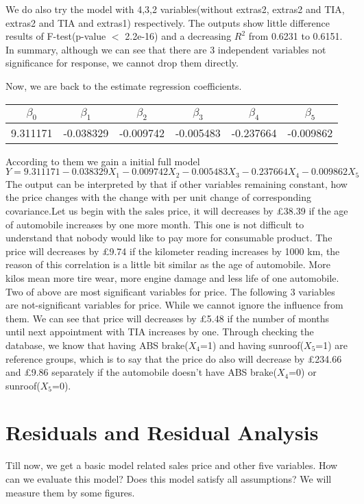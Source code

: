 \documentclass[a4paper]{article}
\begin{document}
\noindent
 We do also try the model with 4,3,2 variables(without extras2, extras2 and TIA, extras2 and TIA and extras1) respectively. The outputs show little difference results of F-test(p-value $<$ 2.2e-16) and a decreasing $R^2$ from 0.6231 to 0.6151. In summary, although we can see that there are 3 independent variables not significance for response, we cannot drop them directly.

\noindent
Now, we are back to the estimate regression coefficients.
\begin{center}
\begin{tabular}{cccccc}
\toprule
$\beta_0$&$\beta_1$&$\beta_2$&$\beta_3$&$\beta_4$&$\beta_5$\\
\midrule
9.311171& -0.038329&-0.009742&-0.005483&-0.237664&-0.009862\\
\bottomrule
\end{tabular}
\end{center}
According to them we gain a initial full model
\[Y=9.311171-0.038329X_1-0.009742X_2-0.005483X_3-0.237664X_4-0.009862X_5\]
The output can be interpreted by that if other variables remaining constant, how the price changes with the change with per unit change of corresponding covariance.Let us begin with the sales price, it will decreases by  \pounds 38.39 if the age of automobile increases by one more month. This one is not difficult to understand that nobody would like to pay more for consumable product. The price will decreases by \pounds9.74 if the kilometer reading increases by 1000 km, the reason of this correlation is a little bit similar as the age of automobile. More kilos mean more tire wear, more engine damage and less life of one automobile. Two of above are most significant variables for price.  The following 3 variables are not-significant variables for price. While we cannot ignore the influence from them. We can see that price will decreases by  \pounds 5.48 if the number of months until next appointment with TIA increases by one. Through checking the database, we know that having ABS brake($X_4$=1) and having sunroof($X_5$=1) are reference groups, which is to say that the price do also will decrease by \pounds234.66 and \pounds9.86 separately if the automobile doesn't have ABS brake($X_4$=0) or sunroof($X_5$=0).\\






\section{Residuals and Residual Analysis}
Till now, we get a basic model related sales price and other five variables. How can we evaluate this model? Does this model satisfy all assumptions? We will measure them by some figures.\\
\end{document}
